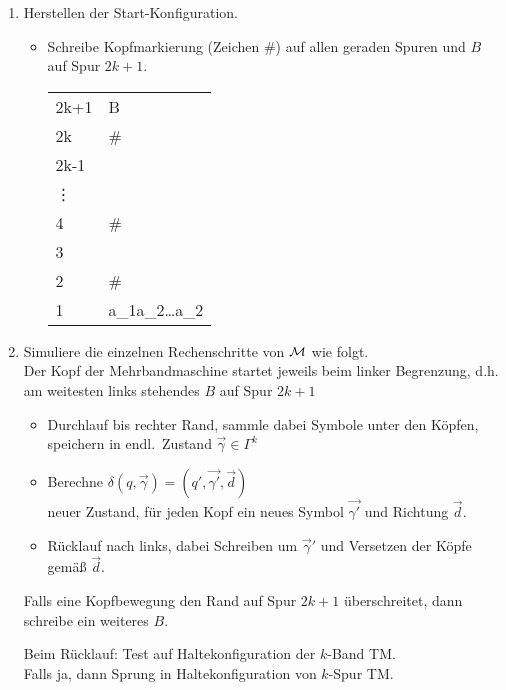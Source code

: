 \begin{Bemerkung}
	\begin{enumerate}
	 \item Herstellen der Start-Konfiguration.
	 
	 \begin{itemize}
	  \item Schreibe Kopfmarkierung (Zeichen \#) auf allen geraden Spuren und $B$ auf Spur $2k+1$.
	  
	  	\begin{tabular}{*2{M{l}}}
		2k+1 & \blank B \blank\\
		2k & \#\\
		2k-1 & \blank\\
		\vdots\\
		4 & \#\\
		3 & \blank\\
		2 & \#\\
		1 & a_1a_2\dots a_2
	\end{tabular} 
	 \end{itemize}
	 
    \item Simuliere die einzelnen Rechenschritte von $\mathcal{M}$ wie folgt.\\
	Der Kopf der Mehrbandmaschine startet jeweils beim linker Begrenzung, d.h. am weitesten links stehendes $B$ auf Spur $2k+1$
	\begin{itemize}
		\item Durchlauf bis rechter Rand, sammle dabei Symbole unter den Köpfen, speichern in endl.\ Zustand $\overrightarrow{\gamma} \in \Gamma^k$
		\item Berechne $\delta(q,\overrightarrow{\gamma})=(q',\overrightarrow{\gamma'},\overrightarrow{d})$\\
		neuer Zustand, für jeden Kopf ein neues Symbol $\overrightarrow{\gamma'}$ und Richtung $\overrightarrow{d}$.
		\item Rücklauf nach links, dabei Schreiben um $\overrightarrow{\gamma}'$ und Versetzen der Köpfe gemäß $\overrightarrow{d}$.
	\end{itemize}
	Falls eine Kopfbewegung den Rand auf Spur $2k+1$ überschreitet, dann schreibe ein weiteres $B$.
	
	Beim Rücklauf: Test auf Haltekonfiguration der $k$-Band \ac{TM}.\\
	Falls ja, dann Sprung in Haltekonfiguration von $k$-Spur \ac{TM}.
% 	
% 
	\end{enumerate}

\end{Bemerkung}


